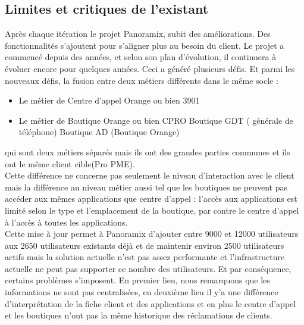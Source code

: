 \subsection[Limites et critiques de l’existant]{Limites et critiques de l’existant}
Après chaque itération le projet Panoramix, subit des améliorations. Des fonctionnalités s’ajoutent pour s’aligner plus au besoin du client. Le projet a commencé depuis des années, et selon son plan d’évolution, il continuera à évoluer encore pour quelques années. Ceci a généré plusieurs défis. Et parmi les nouveaux défis, la fusion entre deux métiers différents dans le  même socle :
\begin{itemize}
	\item Le métier de Centre d’appel Orange ou bien 3901
	\item Le métier de Boutique Orange ou bien CPRO
		\subitem \textbullet Boutique GDT ( générale de téléphone)
		\subitem \textbullet Boutique AD (Boutique Orange)
\end{itemize}
qui sont deux métiers séparés mais ils ont des grandes parties communes et ils ont le même client cible(Pro PME).\\
Cette différence ne concerne pas seulement le niveau d’interaction avec le client mais la différence au niveau métier aussi tel que les boutiques ne peuvent pas accéder aux mêmes applications que centre d’appel : l’accès aux applications est limité selon le type et l’emplacement de la boutique, par contre le centre d’appel à l’accès à toutes les applications.\\
Cette mise à jour permet à Panoramix d’ajouter entre 9000 et 12000 utilisateurs aux 2650 utilisateurs existants déjà et  de maintenir environ 2500 utilisateurs actifs mais la solution actuelle n’est pas assez performante et l’infrastructure actuelle ne peut pas supporter ce nombre des utilisateurs. Et par conséquence, certains problèmes s’imposent. En premier lieu, nous remarquons que les informations ne sont pas centralisées, en deuxième lieu il y’a une différence d’interprétation de la fiche client et des applications et en plus le centre d’appel et les boutiques n’ont pas la même historique des réclamations de clients.\\
